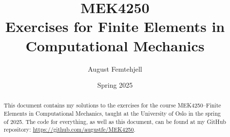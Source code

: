 \documentclass[a4paper,12pt]{article}
\title{
    MEK4250\\
    \small{Exercises for Finite Elements in Computational Mechanics}
}
\author{August Femtehjell}
\date{Spring 2025}
\theoremstyle{breaktheorem}
\theoremstyle{exerciseStyle}
\theoremstyle{solutionStyle}
\begin{document}
\maketitle

\tableofcontents

\begin{abstract}
    This document contains my solutions to the exercises for the course MEK4250--Finite Elements in Computational Mechanics, taught at the University of Oslo in the spring of 2025.
    The code for everything, as well as this document, can be found at my GitHub repository: \url{https://github.com/augustfe/MEK4250}.
\end{abstract}










\end{document}
